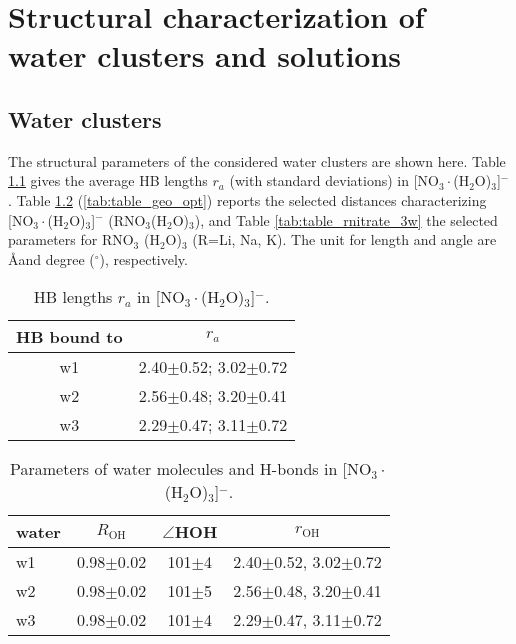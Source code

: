 \chapter{Structural characterization of water clusters and solutions}
\section{Water clusters}\label{structure_of_clusters}
The structural parameters of the considered water clusters are shown here.
Table \ref{tab:3_nitrate_bond_0} gives the average HB lengths $r_a$ (with standard deviations) in [NO$_3\cdot$(H$_2$O)$_3$]$^-$.  
Table \ref{tab:3w_nitrate} (\ref{tab:table_geo_opt}) reports the selected distances characterizing 
[NO$_3\cdot$(H$_2$O)$_3$]$^-$ (RNO$_3$(H$_2$O)$_3$), and Table \ref{tab:table_rnitrate_3w} the selected parameters for RNO$_3$   
 (H$_2$O)$_3$ (R=Li, Na, K).
The unit for length and angle are \AA and degree ($^\circ$), respectively.
% 
\begin{table}[!h]
\centering
\caption{\label{tab:3_nitrate_bond_0}%
HB lengths $r_a$ in [NO$_3\cdot$(H$_2$O)$_3$]$^-$.} %
\begin{tabular}{cc} \\\toprule
 HB bound to & \multicolumn{1}{c}{ $r_a$} \\
\hline
 w1 &2.40$\pm$0.52; 3.02$\pm$0.72 \\
 w2 &2.56$\pm$0.48; 3.20$\pm$0.41 \\
 w3 &2.29$\pm$0.47; 3.11$\pm$0.72
\end{tabular}
\end{table}
%
\begin{table}[!htbp]
\centering
\caption{\label{tab:3w_nitrate}%
Parameters of water molecules and H-bonds in [NO$_3\cdot$(H$_2$O)$_3$]$^-$.} %
\begin{tabular}{lccc}
water &$R_\text{OH}$ &$\angle$HOH & $r_\text{OH}$ \\
\hline
w1 &0.98$\pm$0.02 &101$\pm$4 & 2.40$\pm$0.52, 3.02$\pm$0.72 \\
w2 &0.98$\pm$0.02 &101$\pm$5 & 2.56$\pm$0.48, 3.20$\pm$0.41 \\
w3 &0.98$\pm$0.02 &101$\pm$4 & 2.29$\pm$0.47, 3.11$\pm$0.72
\end{tabular}
\end{table}
%
